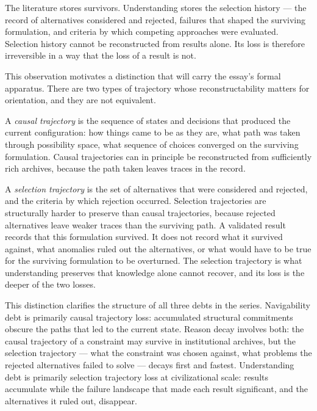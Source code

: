 \begin{principle}
The literature stores survivors. Understanding stores the selection history
--- the record of alternatives considered and rejected, failures that shaped
the surviving formulation, and criteria by which competing approaches were
evaluated. Selection history cannot be reconstructed from results alone.
Its loss is therefore irreversible in a way that the loss of a result is not.
\end{principle}

This observation motivates a distinction that will carry the essay's formal
apparatus. There are two types of trajectory whose reconstructability matters
for orientation, and they are not equivalent.

A \emph{causal trajectory} is the sequence of states and decisions that
produced the current configuration: how things came to be as they are, what
path was taken through possibility space, what sequence of choices converged
on the surviving formulation. Causal trajectories can in principle be
reconstructed from sufficiently rich archives, because the path taken leaves
traces in the record.

A \emph{selection trajectory} is the set of alternatives that were considered
and rejected, and the criteria by which rejection occurred. Selection
trajectories are structurally harder to preserve than causal trajectories,
because rejected alternatives leave weaker traces than the surviving path.
A validated result records that this formulation survived. It does not record
what it survived against, what anomalies ruled out the alternatives, or what
would have to be true for the surviving formulation to be overturned. The
selection trajectory is what understanding preserves that knowledge alone
cannot recover, and its loss is the deeper of the two losses.

This distinction clarifies the structure of all three debts in the series.
Navigability debt is primarily causal trajectory loss: accumulated structural
commitments obscure the paths that led to the current state. Reason decay
involves both: the causal trajectory of a constraint may survive in institutional
archives, but the selection trajectory --- what the constraint was chosen
against, what problems the rejected alternatives failed to solve --- decays
first and fastest. Understanding debt is primarily selection trajectory loss
at civilizational scale: results accumulate while the failure landscape that
made each result significant, and the alternatives it ruled out, disappear.

